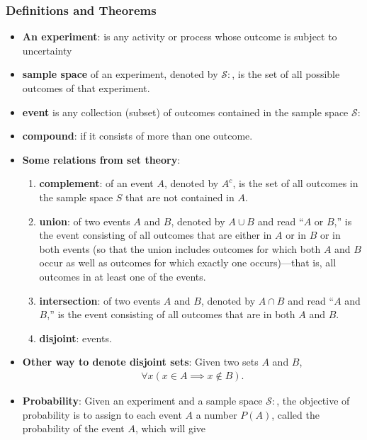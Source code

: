 \documentclass{report}
\begin{document}
    \subsubsection{Definitions and Theorems}
    \begin{itemize}
        \item \textbf{An experiment}: is any activity or process whose outcome is subject to uncertainty
        \item \textbf{sample space} of an experiment, denoted by $\mathcal{S}:$, is the set of all possible outcomes of that experiment.
        \item \textbf{event} is any collection (subset) of outcomes contained in the sample space $\mathcal{S}: $
        \item \textbf{compound}: if it consists of more than one outcome.
        \item \textbf{Some relations from set theory}:
            \begin{enumerate}
                \item \textbf{complement}: of an event \( A \), denoted by \( A^c \), is the set of all outcomes in the sample space \( S \) that are not contained in \( A \).
                \item \textbf{union}: of two events \( A \) and \( B \), denoted by \( A \cup B \) and read “\( A \) or \( B \),” is the event consisting of all outcomes that are either in \( A \) or in \( B \) or in both events (so that the union includes outcomes for which both \( A \) and \( B \) occur as well as outcomes for which exactly one occurs)—that is, all outcomes in at least one of the events.
                \item \textbf{intersection}: of two events \( A \) and \( B \), denoted by \( A \cap B \) and read “\( A \) and \( B \),” is the event consisting of all outcomes that are in both \( A \) and \( B \).
                \item \textbf{disjoint}: events.
            \end{enumerate}
        \item \textbf{Other way to denote disjoint sets}: Given two sets $A$ and $B$,
            \begin{align*}
                \forall x(x\in A \implies x \notin B)
            .\end{align*}
        \item \textbf{Probability}: Given an experiment and a sample space $\mathcal{S}:$, the objective of probability is to assign
to each event $A$ a number $P(A)$, called the probability of the event $A$, which will give

\end{itemize}
\end{document}
